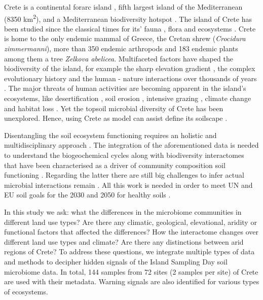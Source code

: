 Crete is a continental forarc island \parencite{ali2016}, fifth largest island of the Mediterranean (8350 km\textsuperscript{2}),
and a Mediterranean biodiversity hotspot \parencite{myers2000biodiversity}.
The island of Crete has been studied since the classical times for its'
fauna \parencite{Sidiropoulos_Polymeni_Legakis_2017,Anastasiou2018Tenebrionid}, flora \parencite{Krimbas_2005} and ecosystems \parencite{Grove1993}.
Crete is home to the only endemic mammal of Greece, the Cretan shrew (\textit{Crocidura zimmermanni}),
more than 350 endemic arthropods \parencite{bolanakis2024} and 183 endemic plants \parencite{Kougioumoutzis2020}
among them a tree \textit{Zelkova abelicea}. Multifaceted factors have shaped the
biodiversity of the island, for example the sharp elevation gradient \parencite{trigas2013elevational, FAZAN2017},
the complex evolutionary history \parencite{POULAKAKIS2002} and the human - nature
interactions over thousands of years \parencite{Vogiatzakis2008_med, Sfenthourakis2017}.
The major threats of human activities are becoming apparent in the island's ecosystems,
like desertification \parencite{KARAMESOUTI2018266}, soil erosion \parencite{PANAGOS2014147, su14052738}, intensive grazing \parencite{JouffroyBapicot2016},
climate change \parencite{Kougioumoutzis2020,Vogiatzakis2016} and habitat loss \parencite{ISPIKOUDIS1993259}.
Yet the topsoil microbial diversity of Crete has been unexplored. Hence, using Crete as model can 
assist define its soilscape \parencite{LAGACHERIE2001105}.

Disentangling the soil ecosystem functioning requires an holistic and 
multidisciplinary approach \parencite{vogel2022}. The integration of the aforementioned
data is needed to understand the biogeochemical cycles along with biodiversity interactomes 
that have been characterised as a driver of community composition soil
functioning \parencite{GUSEVA2022108604}.
Regarding the latter there are still big challenges to infer actual microbial
interactions remain \parencite{Faust2021}. All this work is needed in order to meet
UN and EU soil goals for the 2030 and 2050 for healthy soils \parencite{LAL2021e00398}.

In this study we ask: what the differences in the microbiome communities in different land use types?
Are there any climatic, geological, elevational, aridity or functional factors that affected the differences?
How the interactome changes over different land use types and climate?
Are there any distinctions between arid regions of Crete?
To address these questions, we integrate multiple types of data and methods to decipher hidden 
signals of the Island Sampling Day soil microbiome data. In total, 144 samples from
72 sites (2 samples per site) of Crete are used with their metadata.
Warning signals are also identified for various types of ecosystems.


